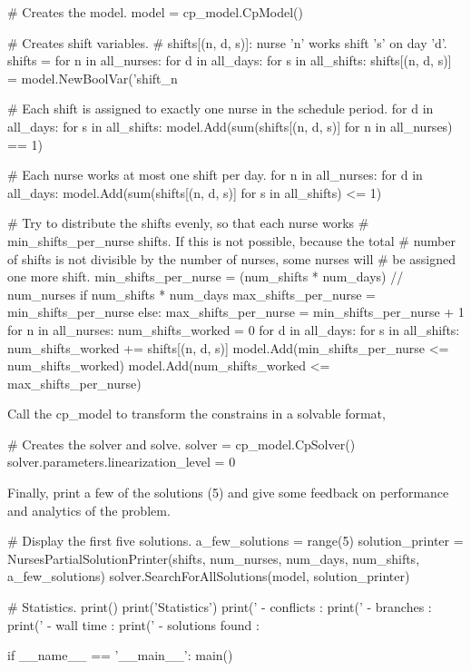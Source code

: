 \documentclass[
12pt,				%
openright,			%
oneside,			%
a4paper,			%
brazil,				%
english,			%
]{abntex2}
\begin{document}
\begin{python}
    # Creates the model.
    model = cp_model.CpModel()

    # Creates shift variables.
    # shifts[(n, d, s)]: nurse 'n' works shift 's' on day 'd'.
    shifts = {}
    for n in all_nurses:
        for d in all_days:
            for s in all_shifts:
                shifts[(n, d,
                        s)] = model.NewBoolVar('shift_n%

    # Each shift is assigned to exactly one nurse in the schedule period.
    for d in all_days:
        for s in all_shifts:
            model.Add(sum(shifts[(n, d, s)] for n in all_nurses) == 1)

    # Each nurse works at most one shift per day.
    for n in all_nurses:
        for d in all_days:
            model.Add(sum(shifts[(n, d, s)] for s in all_shifts) <= 1)

    # Try to distribute the shifts evenly, so that each nurse works
    # min_shifts_per_nurse shifts. If this is not possible, because the total
    # number of shifts is not divisible by the number of nurses, some nurses will
    # be assigned one more shift.
    min_shifts_per_nurse = (num_shifts * num_days) // num_nurses
    if num_shifts * num_days %
        max_shifts_per_nurse = min_shifts_per_nurse
    else:
        max_shifts_per_nurse = min_shifts_per_nurse + 1
    for n in all_nurses:
        num_shifts_worked = 0
        for d in all_days:
            for s in all_shifts:
                num_shifts_worked += shifts[(n, d, s)]
        model.Add(min_shifts_per_nurse <= num_shifts_worked)
        model.Add(num_shifts_worked <= max_shifts_per_nurse)
\end{python}

Call the cp_model to transform the constrains in a solvable format,

\begin{python}
    # Creates the solver and solve.
    solver = cp_model.CpSolver()
    solver.parameters.linearization_level = 0
\end{python}

Finally, print a few of the solutions (5) and give some feedback on
performance and analytics of the problem.

\begin{python}
    # Display the first five solutions.
    a_few_solutions = range(5)
    solution_printer = NursesPartialSolutionPrinter(shifts, num_nurses,
                                                    num_days, num_shifts,
                                                    a_few_solutions)
    solver.SearchForAllSolutions(model, solution_printer)

    # Statistics.
    print()
    print('Statistics')
    print('  - conflicts       : %
    print('  - branches        : %
    print('  - wall time       : %
    print('  - solutions found : %

if __name__ == '__main__':
    main()
\end{python}
\end{document}
